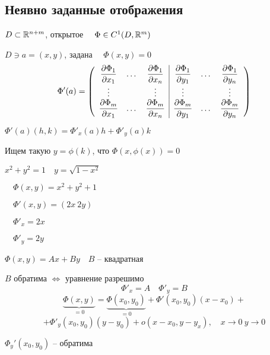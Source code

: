     \subsection*{Неявно заданные отображения}

    $D \subset \mathbb{R}^{n+m}$, открытое $\quad \Phi \in C^1(D, \mathbb{R}^m)$
    \par $D \ni a = (x, y)$, задана $\quad \Phi(x, y) = 0$
    \[
        \Phi'(a) = \left(\begin{array}{c c c | c c c}
            \dfrac{\partial \Phi_1}{\partial x_1} & \dots & \dfrac{\partial \Phi_1}{\partial x_n} & \dfrac{\partial \Phi_1}{\partial y_1} & \dots & \dfrac{\partial \Phi_1}{\partial y_n} \\
            \vdots & & \vdots & \vdots & & \vdots \\
            \dfrac{\partial \Phi_m}{\partial x_1} & \dots & \dfrac{\partial \Phi_m}{\partial x_n} & \dfrac{\partial \Phi_m}{\partial y_1} & \dots & \dfrac{\partial \Phi_m}{\partial y_n} \\
        \end{array}\right)
    \]

    \par $\Phi'(a)(h, k) = \Phi'_x(a)h + \Phi'_y(a)k$
    \par Ищем такую $y = \phi(k)$, что $\Phi(x, \phi(x)) = 0$

    \begin{illustration}
        $x^2 + y^2 = 1 \quad y = \sqrt{1 - x^2}$
        \par $\quad \Phi(x, y) = x^2 + y^2 + 1$
        \par $\quad \Phi'(x, y) = (2x \ 2y)$
        \par $\quad \Phi'_x = 2x$
        \par $\quad \Phi'_y = 2y$
    \end{illustration}

    \begin{illustration}
        $\Phi(x, y) = Ax + By \quad B$ -- квадратная
        \par \quad $B$ обратима $\Leftrightarrow$ уравнение разрешимо
        \[
            \Phi'_x = A \quad \Phi'_y = B    
        \]
        \[
            \underbrace{\Phi(x, y)}_{=0} = \underbrace{\Phi(x_0, y_0)}_{=0} + \Phi'(x_0, y_0)(x - x_0) +    
        \]
        \[
            + \Phi'_y(x_0, y_0)(y - y_0) + o(x-x_0, y-y_x), \quad x \rightarrow 0 \ y \rightarrow 0    
        \]
        \par $\Phi_y'(x_0, y_0)$ -- обратима
    \end{illustration}

